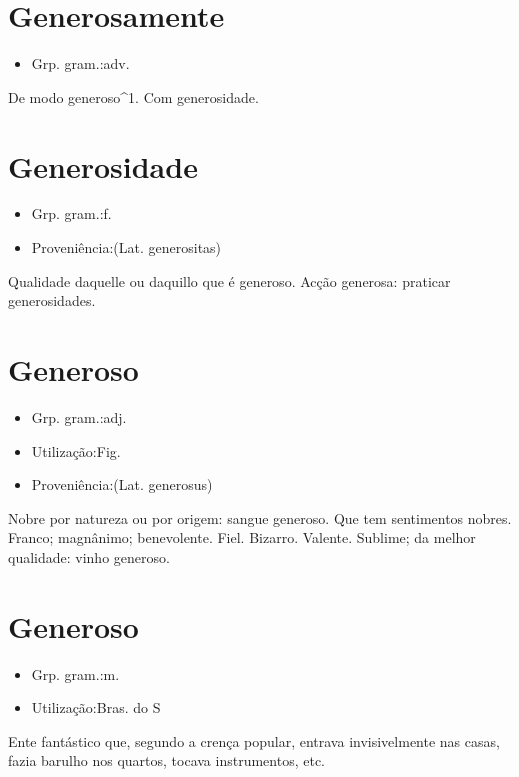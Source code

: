 \section{Generosamente}
\begin{itemize}
\item {Grp. gram.:adv.}
\end{itemize}
De modo generoso^1.
Com generosidade.
\section{Generosidade}
\begin{itemize}
\item {Grp. gram.:f.}
\end{itemize}
\begin{itemize}
\item {Proveniência:(Lat. \textunderscore generositas\textunderscore )}
\end{itemize}
Qualidade daquelle ou daquillo que é generoso.
Acção generosa: \textunderscore praticar generosidades\textunderscore .
\section{Generoso}
\begin{itemize}
\item {Grp. gram.:adj.}
\end{itemize}
\begin{itemize}
\item {Utilização:Fig.}
\end{itemize}
\begin{itemize}
\item {Proveniência:(Lat. \textunderscore generosus\textunderscore )}
\end{itemize}
Nobre por natureza ou por origem: \textunderscore sangue generoso\textunderscore .
Que tem sentimentos nobres.
Franco; magnânimo; benevolente.
Fiel.
Bizarro.
Valente.
Sublime; da melhor qualidade: \textunderscore vinho generoso\textunderscore .
\section{Generoso}
\begin{itemize}
\item {Grp. gram.:m.}
\end{itemize}
\begin{itemize}
\item {Utilização:Bras. do S}
\end{itemize}
Ente fantástico que, segundo a crença popular, entrava invisivelmente nas casas, fazia barulho nos quartos, tocava instrumentos, etc.
